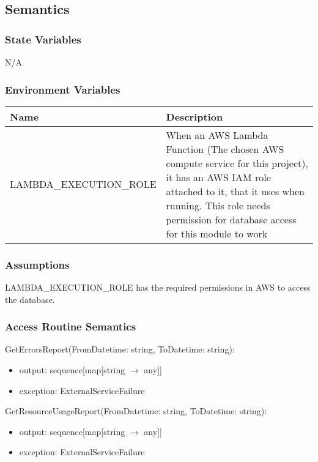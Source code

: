 \documentclass[12pt, titlepage]{article}
\begin{document}
{  \subsection{Semantics}

  \subsubsection{State Variables}

  N/A
  \subsubsection{Environment Variables}
  \begin{center}
    \begin{tabular}{p{6cm} p{10cm}}
      \hline
      \textbf{Name} & \textbf{Description} \\
      \hline
      LAMBDA\_EXECUTION\_ROLE & When an AWS Lambda Function (The chosen
      AWS compute service for this project), it has an AWS IAM role
      attached to it, that it uses when running. This role needs
      permission for database access for this module to work \\
      \hline
    \end{tabular}
  \end{center}

  \subsubsection{Assumptions}

  LAMBDA\_EXECUTION\_ROLE has the required permissions in AWS to access
  the database.

  \subsubsection{Access Routine Semantics}
  \noindent GetErrorsReport(FromDatetime: string, ToDatetime: string):
  \begin{itemize}
    \item output: sequence[map[string $\rightarrow$ any]]
    \item exception: ExternalServiceFailure
  \end{itemize}

  \noindent GetResourceUsageReport(FromDatetime: string, ToDatetime: string):
  \begin{itemize}
    \item output: sequence[map[string $\rightarrow$ any]]
    \item exception: ExternalServiceFailure
  \end{itemize}

}
\end{document}
